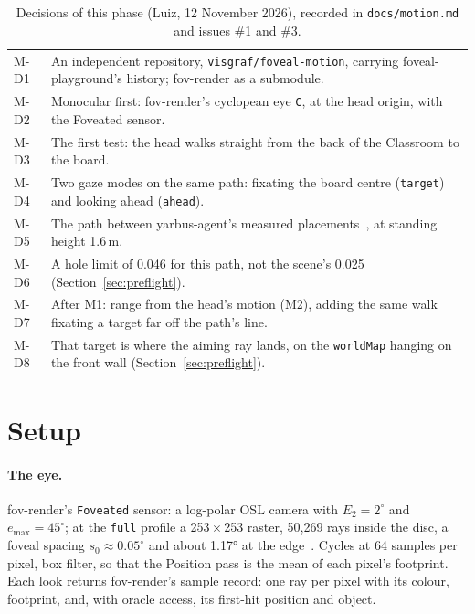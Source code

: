 \documentclass[11pt,a4paper]{article}
\newcommand{\code}[1]{\texttt{\small #1}}
\newcommand{\emax}{e_{\max}}
\begin{document}
\begin{table}[h]
\centering\small
\begin{tabularx}{\linewidth}{@{}lL@{}}
\toprule
M-D1 & An independent repository, \code{visgraf/foveal-motion}, carrying foveal-playground's history; fov-render as a submodule. \\
M-D2 & Monocular first: fov-render's cyclopean eye \code{C}, at the head origin, with the Foveated sensor. \\
M-D3 & The first test: the head walks straight from the back of the Classroom to the board. \\
M-D4 & Two gaze modes on the same path: fixating the board centre (\code{target}) and looking ahead (\code{ahead}). \\
M-D5 & The path between yarbus-agent's measured placements~\cite{yarbus}, at standing height 1.6\,m. \\
M-D6 & A hole limit of 0.046 for this path, not the scene's 0.025 (Section~\ref{sec:preflight}). \\
M-D7 & After M1: range from the head's motion (M2), adding the same walk fixating a target far off the path's line. \\
M-D8 & That target is where the aiming ray lands, on the \code{worldMap} hanging on the front wall (Section~\ref{sec:preflight}). \\
\bottomrule
\end{tabularx}
\caption{Decisions of this phase (Luiz, 12 November 2026), recorded in \code{docs/motion.md} and issues \#1 and \#3.}
\label{tab:decisions}
\end{table}

\section{Setup}\label{sec:setup}

\paragraph{The eye.} fov-render's \code{Foveated} sensor: a log-polar OSL camera with $E_2=2^\circ$ and $\emax=45^\circ$; at the
\code{full} profile a 253\,$\times$\,253 raster, 50{,}269 rays inside the disc, a foveal spacing $s_0\approx0.05^\circ$ and
about 1.17° at the edge~\cite{fovrendertr}. Cycles at 64 samples per pixel, box filter, so that the Position pass is the
mean of each pixel's footprint. Each look returns fov-render's sample record: one ray per pixel with its colour,
footprint, and, with oracle access, its first-hit position and object.
\end{document}

